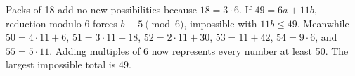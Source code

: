 Packs of 18 add no new possibilities because $18=3\cdot6$. If $49=6a+11b$, reduction modulo 6 forces $b\equiv5\pmod6$, impossible with $11b\le49$. Meanwhile $50=4\cdot11+6$, $51=3\cdot11+18$, $52=2\cdot11+30$, $53=11+42$, $54=9\cdot6$, and $55=5\cdot11$. Adding multiples of 6 now represents every number at least 50. The largest impossible total is $\boxed{49}$.
